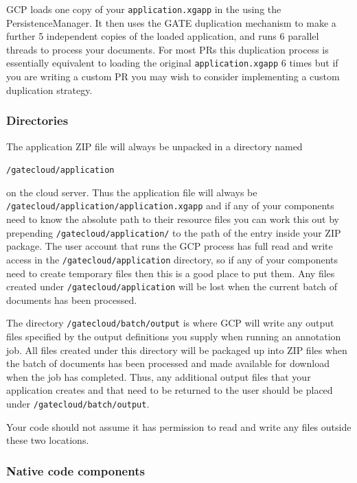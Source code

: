 GCP loads one copy of your \verb!application.xgapp! in the
using the PersistenceManager.  It then uses the GATE
{duplication mechanism}
to make a further 5 independent copies of the loaded application, and runs 6
parallel threads to process your documents.  For most PRs this duplication
process is essentially equivalent to loading the original \verb^application.xgapp^ 6
times but if you are writing a custom PR you may wish to consider implementing
a custom duplication strategy.

\subsubsection{Directories}

The application ZIP file will always be unpacked in a directory named
\begin{small}\verb^/gatecloud/application^\end{small} on the cloud server.  
Thus the application file will
always be\\
\verb^/gatecloud/application/application.xgapp^ and if any of your
components need to know the absolute path to their resource files you can work
this out by prepending \verb^/gatecloud/application/^ to the path of the entry
inside your ZIP package.  The user account that runs the GCP process has full
read and write access in the \verb^/gatecloud/application^ directory, so if any of
your components need to create temporary files then this is a good place to put
them.  Any files created under \verb^/gatecloud/application^ will be lost when the
current batch of documents has been processed.

The directory \verb^/gatecloud/batch/output^ is where GCP will write any output
files specified by the output definitions you supply when running an annotation
job.  All files created under this directory will be packaged up into ZIP files
when the batch of documents has been processed and made available for download
when the job has completed.  Thus, any additional output files that your
application creates and that need to be returned to the user should be placed
under \verb^/gatecloud/batch/output^.

Your code should not assume it has permission to read and write any files
outside these two locations.

\subsubsection{Native code components}


